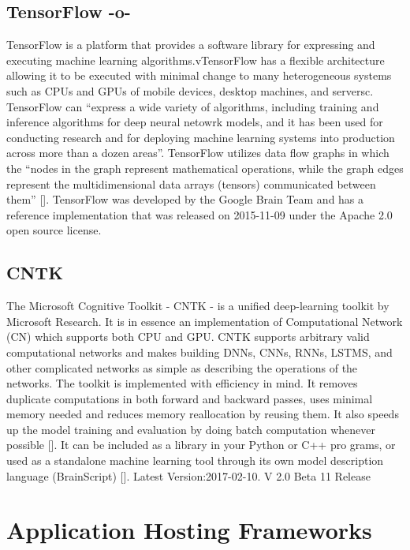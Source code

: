       
\subsection{TensorFlow -o-}

TensorFlow is a platform that provides a software library for
expressing and executing machine learning algorithms.vTensorFlow has a
flexible architecture allowing it to be executed with minimal change
to many heterogeneous systems such as CPUs and GPUs of mobile devices,
desktop machines, and serversc\cite{tensorflow-paper-2016}.
TensorFlow can ``express a wide variety of algorithms, including
training and inference algorithms for deep neural netowrk models, and
it has been used for conducting research and for deploying machine
learning systems into production across more than a dozen
areas''. TensorFlow utilizes data flow graphs in which the ``nodes in
the graph represent mathematical operations, while the graph edges
represent the multidimensional data arrays (tensors) communicated
between them'' [\cite{www-tensorflow}].  TensorFlow was developed by the
Google Brain Team and has a reference implementation that was released
on 2015-11-09 under the Apache 2.0 open source license.


    
\subsection{CNTK}

The Microsoft Cognitive Toolkit - CNTK - is a unified deep-learning
toolkit by Microsoft Research. It is in essence an implementation of
Computational Network (CN) which supports both CPU and GPU. CNTK
supports arbitrary valid computational networks and makes building
DNNs, CNNs, RNNs, LSTMS, and other complicated networks as simple as
describing the operations of the networks.  The toolkit is implemented
with efficiency in mind. It removes duplicate computations in both
forward and backward passes, uses minimal memory needed and reduces
memory reallocation by reusing them. It also speeds up the model
training and evaluation by doing batch computation whenever
possible [\cite{book-cntk}]. It can be included as a library in your
Python or C++ pro grams, or used as a standalone machine learning tool
through its own model description language
(BrainScript) [\cite{www-cntk}]. Latest Version:2017-02-10. V 2.0 Beta
11 Release


\section{Application Hosting Frameworks}

